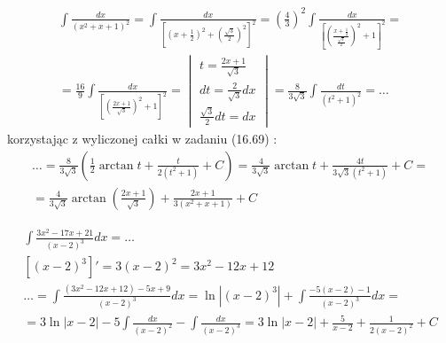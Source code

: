 
\begin{gather*}
  \int \frac{dx}{(x^2+x+1)^2}
  = \int \frac{dx}{[(x+\frac{1}{2})^2+(\frac{\sqrt{3}}{2})^2]^2}
  = \left(\frac{4}{3}\right)^2\int \frac{dx}{\left[\left(\frac{x+\frac{1}{2}}{\frac{\sqrt{3}}{2}}\right)^2+1\right]^2} = \\
  = \frac{16}{9} \int \frac{dx}{\left[\left(\frac{2x+1}{\sqrt{3}}\right)^2+1\right]^2} =
  \begin{vmatrix}
    t=\frac{2x+1}{\sqrt{3}} \\
    dt=\frac{2}{\sqrt{3}}dx \\
    \frac{\sqrt{3}}{2}dt=dx
  \end{vmatrix}
  = \frac{8}{3\sqrt{3}}\int \frac{dt}{(t^2+1)^2} = \ldots
\end{gather*}
korzystając z wyliczonej całki w zadaniu (16.69) :
\begin{gather*}\ldots = \frac{8}{3\sqrt{3}} \left( \frac{1}{2}\arctan t + \frac{t}{2(t^2+1)}+C \right)
 = \frac{4}{3\sqrt{3}} \arctan t + \frac{4t}{3\sqrt{3}(t^2+1)}+C = \\
= \frac{4}{3\sqrt{3}} \arctan \left( \frac{2x+1}{\sqrt{3}}\right) + \frac{2x+1}{3(x^2+x+1)} +C
\end{gather*}




\begin{gather*}
  \int \frac{3x^2-17x+21}{(x-2)^3}dx = \ldots \\
  [(x-2)^3]' =3(x-2)^2=3x^2-12x+12 \\
  \ldots = \int\frac{(3x^2-12x+12)-5x+9}{(x-2)^3}dx
  = \ln|(x-2)^3|+\int \frac{-5(x-2)-1}{(x-2)^3}dx = \\
  = 3\ln|x-2|-5\int \frac{dx}{(x-2)^2}-\int \frac{dx}{(x-2)^3}
  = 3\ln|x-2|+\frac{5}{x-2}+\frac{1}{2(x-2)^2}+C
\end{gather*}


